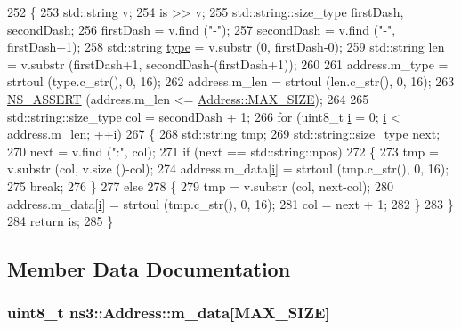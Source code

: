 \begin{DoxyCode}
252 \{
253   std::string v;
254   is >> v;
255   std::string::size\_type firstDash, secondDash;
256   firstDash = v.find (\textcolor{stringliteral}{"-"});
257   secondDash = v.find (\textcolor{stringliteral}{"-"}, firstDash+1);
258   std::string \hyperlink{visualizer-ideas_8txt_add98db9e15e2a58cf2b57623e7aa893a}{type} = v.substr (0, firstDash-0);
259   std::string len = v.substr (firstDash+1, secondDash-(firstDash+1));
260 
261   address.m\_type = strtoul (type.c\_str(), 0, 16);
262   address.m\_len = strtoul (len.c\_str(), 0, 16);
263   \hyperlink{assert_8h_a6dccdb0de9b252f60088ce281c49d052}{NS\_ASSERT} (address.m\_len <= \hyperlink{classns3_1_1Address_a34cb50781c65195ba10651d82d084b4fae450cf1a7cb3df8a05d29b23aecf7f84}{Address::MAX\_SIZE});
264 
265   std::string::size\_type col = secondDash + 1;
266   \textcolor{keywordflow}{for} (uint8\_t \hyperlink{bernuolliDistribution_8m_a6f6ccfcf58b31cb6412107d9d5281426}{i} = 0; \hyperlink{bernuolliDistribution_8m_a6f6ccfcf58b31cb6412107d9d5281426}{i} < address.m\_len; ++\hyperlink{bernuolliDistribution_8m_a6f6ccfcf58b31cb6412107d9d5281426}{i})
267     \{
268       std::string tmp;
269       std::string::size\_type next;
270       next = v.find (\textcolor{stringliteral}{":"}, col);
271       \textcolor{keywordflow}{if} (next == std::string::npos)
272         \{
273           tmp = v.substr (col, v.size ()-col);
274           address.m\_data[\hyperlink{bernuolliDistribution_8m_a6f6ccfcf58b31cb6412107d9d5281426}{i}] = strtoul (tmp.c\_str(), 0, 16);
275           \textcolor{keywordflow}{break};
276         \}
277       \textcolor{keywordflow}{else}
278         \{
279           tmp = v.substr (col, next-col);
280           address.m\_data[\hyperlink{bernuolliDistribution_8m_a6f6ccfcf58b31cb6412107d9d5281426}{i}] = strtoul (tmp.c\_str(), 0, 16);
281           col = next + 1;
282         \}
283     \}
284   \textcolor{keywordflow}{return} is;
285 \}
\end{DoxyCode}


\subsection{Member Data Documentation}
\subsubsection[{\texorpdfstring{m\+\_\+data}{m_data}}]{\setlength{\rightskip}{0pt plus 5cm}uint8\+\_\+t ns3\+::\+Address\+::m\+\_\+data\mbox{[}{\bf M\+A\+X\+\_\+\+S\+I\+ZE}\mbox{]}\hspace{0.3cm}{\ttfamily [private]}}\hypertarget{classns3_1_1Address_a41d4da5b9c5dc78d0d91915d1cf6828c}{}\label{classns3_1_1Address_a41d4da5b9c5dc78d0d91915d1cf6828c}


